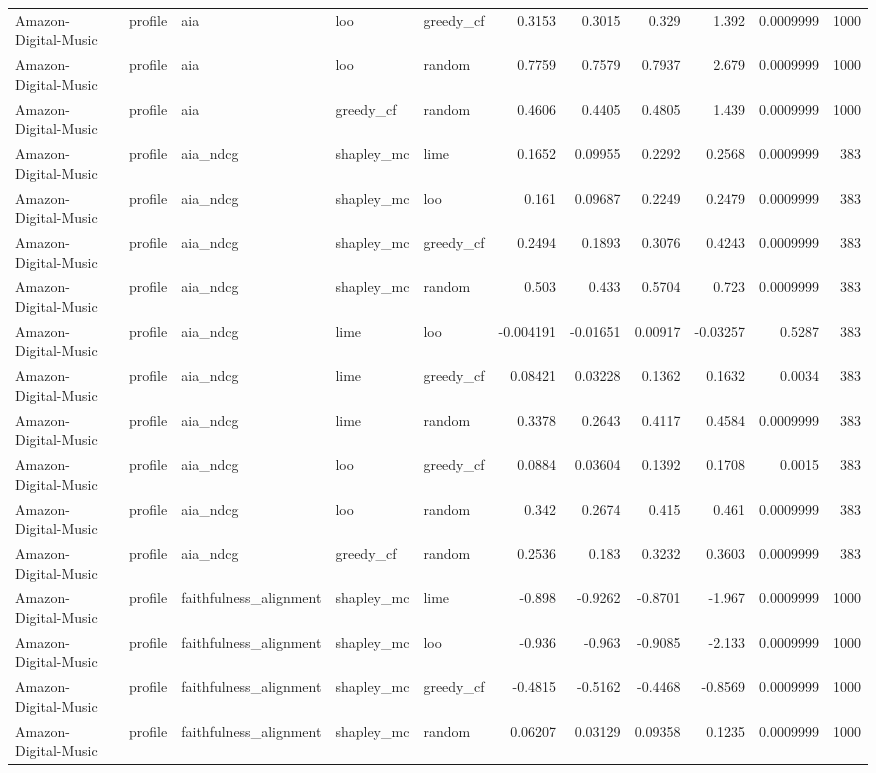 \begin{table}[t]
\begin{tabular}{lllllrrrrrr}
Amazon-Digital-Music & profile & aia & loo & greedy\_cf & 0.3153 & 0.3015 & 0.329 & 1.392 & 0.0009999 & 1000 \\
Amazon-Digital-Music & profile & aia & loo & random & 0.7759 & 0.7579 & 0.7937 & 2.679 & 0.0009999 & 1000 \\
Amazon-Digital-Music & profile & aia & greedy\_cf & random & 0.4606 & 0.4405 & 0.4805 & 1.439 & 0.0009999 & 1000 \\
Amazon-Digital-Music & profile & aia\_ndcg & shapley\_mc & lime & 0.1652 & 0.09955 & 0.2292 & 0.2568 & 0.0009999 & 383 \\
Amazon-Digital-Music & profile & aia\_ndcg & shapley\_mc & loo & 0.161 & 0.09687 & 0.2249 & 0.2479 & 0.0009999 & 383 \\
Amazon-Digital-Music & profile & aia\_ndcg & shapley\_mc & greedy\_cf & 0.2494 & 0.1893 & 0.3076 & 0.4243 & 0.0009999 & 383 \\
Amazon-Digital-Music & profile & aia\_ndcg & shapley\_mc & random & 0.503 & 0.433 & 0.5704 & 0.723 & 0.0009999 & 383 \\
Amazon-Digital-Music & profile & aia\_ndcg & lime & loo & -0.004191 & -0.01651 & 0.00917 & -0.03257 & 0.5287 & 383 \\
Amazon-Digital-Music & profile & aia\_ndcg & lime & greedy\_cf & 0.08421 & 0.03228 & 0.1362 & 0.1632 & 0.0034 & 383 \\
Amazon-Digital-Music & profile & aia\_ndcg & lime & random & 0.3378 & 0.2643 & 0.4117 & 0.4584 & 0.0009999 & 383 \\
Amazon-Digital-Music & profile & aia\_ndcg & loo & greedy\_cf & 0.0884 & 0.03604 & 0.1392 & 0.1708 & 0.0015 & 383 \\
Amazon-Digital-Music & profile & aia\_ndcg & loo & random & 0.342 & 0.2674 & 0.415 & 0.461 & 0.0009999 & 383 \\
Amazon-Digital-Music & profile & aia\_ndcg & greedy\_cf & random & 0.2536 & 0.183 & 0.3232 & 0.3603 & 0.0009999 & 383 \\
Amazon-Digital-Music & profile & faithfulness\_alignment & shapley\_mc & lime & -0.898 & -0.9262 & -0.8701 & -1.967 & 0.0009999 & 1000 \\
Amazon-Digital-Music & profile & faithfulness\_alignment & shapley\_mc & loo & -0.936 & -0.963 & -0.9085 & -2.133 & 0.0009999 & 1000 \\
Amazon-Digital-Music & profile & faithfulness\_alignment & shapley\_mc & greedy\_cf & -0.4815 & -0.5162 & -0.4468 & -0.8569 & 0.0009999 & 1000 \\
Amazon-Digital-Music & profile & faithfulness\_alignment & shapley\_mc & random & 0.06207 & 0.03129 & 0.09358 & 0.1235 & 0.0009999 & 1000 \\

\end{tabular}
\end{table}
